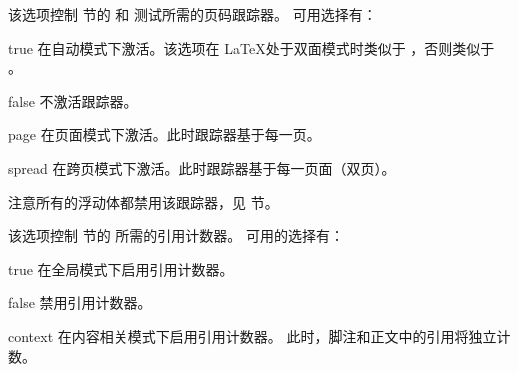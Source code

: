 \begin{optionlist}



该选项控制  节的   和  测试所需的页码跟踪器。
可用选择有：

\begin{valuelist}
\item[true] %
在自动模式下激活。该选项在 \LaTeX 处于双面模式时类似于 ，否则类似于 。
\item[false] %
不激活跟踪器。
\item[page] %
在页面模式下激活。此时跟踪器基于每一页。
\item[spread] %
在跨页模式下激活。此时跟踪器基于每一页面（双页）。
\end{valuelist}

注意所有的浮动体都禁用该跟踪器，见  节。



该选项控制  节的  所需的引用计数器。
可用的选择有：

\begin{valuelist}
\item[true] %
在全局模式下启用引用计数器。
\item[false] %
禁用引用计数器。
\item[context] %
在内容相关模式下启用引用计数器。
此时，脚注和正文中的引用将独立计数。
\end{valuelist}


\end{optionlist}
